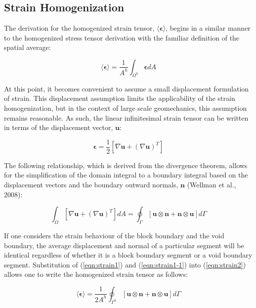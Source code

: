 \subsection{Strain Homogenization}

The derivation for the homogenized strain tensor, $\langle\boldsymbol{\epsilon}\rangle$, begins in a similar manner to the homogenized stress tensor derivation with the familiar definition of the spatial average:

\begin{equation}
\langle\boldsymbol{\epsilon}\rangle=\frac{1}{A^{h}}\int_{\Omega^{h}}\boldsymbol{\epsilon}dA\label{eqn:strain2}
\end{equation}

At this point, it becomes convenient to assume a small displacement formulation of strain. This displacement assumption limits the applicability of the strain homogenization, but in the context of large scale geomechanics, this assumption remains reasonable. As such, the linear infinitesimal strain tensor can be written in terms of the displacement vector, $\mathbf{u}$:

\begin{equation}
\boldsymbol{\epsilon}=\frac{1}{2}\left[\nabla\mathbf{u}+\left(\nabla\mathbf{u}\right)^{T}\right]\label{eqn:strain1}
\end{equation}

The following relationship, which is derived from the divergence theorem, allows for the simplification of the domain integral to a boundary
integral based on the displacement vectors and the boundary outward normals, $\mathbf{n}$ (Wellman et al., 2008):

\begin{equation}
\int_{\Omega}\left[\nabla\mathbf{u}+\left(\nabla\mathbf{u}\right)^{T}\right]dA=\oint_{\Gamma}\left[\mathbf{u}\otimes\mathbf{n}+\mathbf{n}\otimes\mathbf{u}\right]d\Gamma\label{eqn:strain1-1}
\end{equation}

If one considers the strain behaviour of the block boundary and the void boundary, the average displacement and normal of a particular segment
will be identical regardless of whether it is a block boundary segment or a void boundary segment. Substitution of (\ref{eqn:strain1}) and (\ref{eqn:strain1-1}) into (\ref{eqn:strain2}) allows one to write the homogenized strain tensor as follows:

\begin{equation}
\langle\boldsymbol{\epsilon}\rangle=\frac{1}{2A^{h}}\oint_{\Gamma^{h}}\left[\mathbf{u}\otimes\mathbf{n}+\mathbf{n}\otimes\mathbf{u}\right]d\Gamma\label{eqn:strain5-1}
\end{equation}


